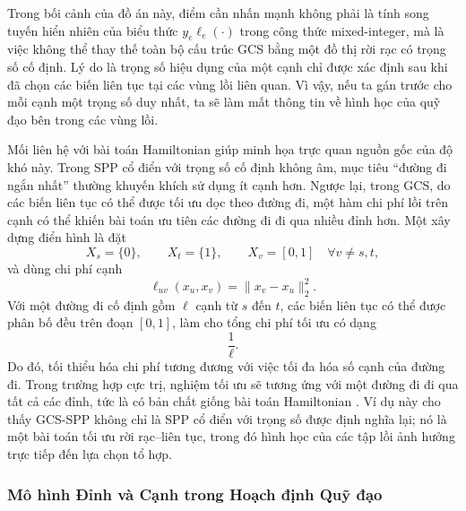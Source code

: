 
Trong bối cảnh của đồ án này, điểm cần nhấn mạnh không phải là tính song tuyến
hiển nhiên của biểu thức $y_e \ell_e(\cdot)$ trong công thức mixed-integer, mà
là việc không thể thay thế toàn bộ cấu trúc GCS bằng một đồ thị rời rạc có
trọng số cố định. Lý do là trọng số hiệu dụng của một cạnh chỉ được xác định
sau khi đã chọn các biến liên tục tại các vùng lồi liên quan. Vì vậy, nếu ta
gán trước cho mỗi cạnh một trọng số duy nhất, ta sẽ làm mất thông tin về hình
học của quỹ đạo bên trong các vùng lồi.

Mối liên hệ với bài toán Hamiltonian giúp minh họa trực quan nguồn gốc của độ
khó này. Trong SPP cổ điển với trọng số cố định không âm, mục tiêu ``đường đi
ngắn nhất'' thường khuyến khích sử dụng ít cạnh hơn. Ngược lại, trong GCS, do
các biến liên tục có thể được tối ưu dọc theo đường đi, một hàm chi phí lồi
trên cạnh có thể khiến bài toán ưu tiên các đường đi đi qua nhiều đỉnh hơn. Một
xây dựng điển hình là đặt
\[
  X_s=\{0\}, \qquad
  X_t=\{1\}, \qquad
  X_v=[0,1] \quad \forall v\neq s,t,
\]
và dùng chi phí cạnh
\[
  \ell_{uv}(x_u,x_v)=\|x_v-x_u\|_2^2 .
\]
Với một đường đi cố định gồm $\ell$ cạnh từ $s$ đến $t$, các biến liên tục có
thể được phân bố đều trên đoạn $[0,1]$, làm cho tổng chi phí tối ưu có dạng
\[
  \frac{1}{\ell}.
\]
Do đó, tối thiểu hóa chi phí tương đương với việc tối đa hóa số cạnh của đường
đi. Trong trường hợp cực trị, nghiệm tối ưu sẽ tương ứng với một đường đi đi
qua tất cả các đỉnh, tức là có bản chất giống bài toán Hamiltonian
\cite{Marcucci2024Thesis}. Ví dụ này cho thấy GCS-SPP không chỉ là SPP cổ điển
với trọng số được định nghĩa lại; nó là một bài toán tối ưu rời rạc--liên tục,
trong đó hình học của các tập lồi ảnh hưởng trực tiếp đến lựa chọn tổ hợp.

\subsubsection{Mô hình Đỉnh và Cạnh trong Hoạch định Quỹ đạo}
\label{subsubsec:gcs_vertex_edge}

